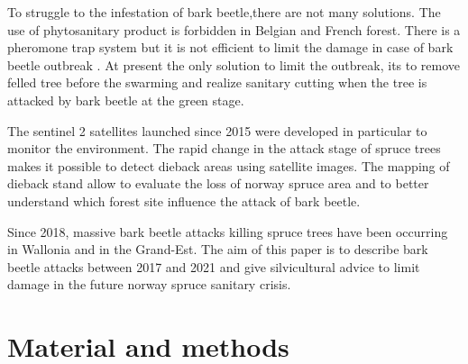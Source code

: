 \documentclass[3p,procedia]{elsarticle}
\begin{document}
To struggle to the infestation of bark beetle,there are not many solutions. 
The use of phytosanitary product is forbidden in Belgian and French forest.
There is a pheromone trap system but it is not efficient to limit the damage in case of bark beetle outbreak \citep{kuhn_pheromone_2022}.
At present the only solution to limit the outbreak, its to remove felled tree before the swarming and realize sanitary cutting when the tree is attacked by bark beetle at the green stage.

The sentinel 2 satellites launched since 2015 were developed in particular to monitor the environment.
The rapid change in the attack stage of spruce trees makes it possible to detect dieback areas using satellite images. The mapping of dieback stand allow to evaluate the loss of norway spruce area and to better understand which forest site influence the attack of bark beetle. 

Since 2018, massive bark beetle attacks killing spruce trees have been occurring in Wallonia and in the Grand-Est.
The aim of this paper is to describe bark beetle attacks between 2017 and 2021 and give silvicultural advice to limit damage in the future norway spruce sanitary crisis.  


\section{Material and methods}
\end{document}
